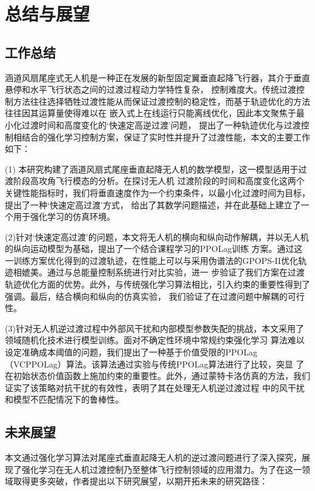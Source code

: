     \chapter{总结与展望}
    \section{工作总结}
    涵道风扇尾座式无人机是一种正在发展的新型固定翼垂直起降飞行器，其介于垂直悬停和水平飞行状态之间的过渡过程动力学特性复杂，
    控制难度大。传统过渡控制方法往往选择牺牲过渡性能从而保证过渡控制的稳定性，而基于轨迹优化的方法往往因其运算量使得难以在
    嵌入式上在线运行只能离线优化，因此本文聚焦于最小化过渡时间和高度变化的‘快速定高逆过渡’问题，
    提出了一种轨迹优化与过渡控制相结合的强化学习控制方案，保证了实时性并提升了过渡性能，本文的主要工作如下：
    
    (1) 本研究构建了涵道风扇式尾座垂直起降无人机的数学模型，这一模型适用于过渡阶段高攻角飞行模态的分析。在探讨无人机
    过渡阶段的时间和高度变化这两个关键性能指标时，我们将垂直速度作为一个约束条件，以最小化过渡时间为目标，提出了一种‘快速定高过渡’方式，
    给出了其数学问题描述，并在此基础上建立了一个用于强化学习的仿真环境。
    
    (2)针对‘快速定高过渡’的问题，本文将无人机的横向和纵向动作解耦，并以无人机的纵向运动模型为基础，提出了一个结合课程学习的PPOLag训练
    方案。通过这一训练方案优化得到的过渡轨迹，在性能上可以与采用伪谱法的GPOPS-II优化轨迹相媲美。通过与总能量控制系统进行对比实验，进一
    步验证了我们方案在过渡轨迹优化方面的优势。此外，与传统强化学习算法相比，引入约束的重要性得到了强调。最后，结合横向和纵向的仿真实验，
    我们验证了在过渡问题中解耦的可行性。
    
    (3)针对无人机逆过渡过程中外部风干扰和内部模型参数失配的挑战，本文采用了领域随机化技术进行模型训练。面对不确定性环境中常规约束强化学习
    算法难以设定准确成本阈值的问题，我们提出了一种基于价值受限的PPOLag（VCPPOLag）算法。该算法通过实验与传统PPOLag算法进行了比较，突显
    了在初始状态价值函数上施加约束的重要性。此外，通过蒙特卡洛仿真的方法，我们证实了该策略对抗干扰的有效性，表明了其在处理无人机逆过渡过程
    中的风干扰和模型不匹配情况下的鲁棒性。
    
    \section{未来展望}
    
    本文通过强化学习算法对尾座式垂直起降无人机的逆过渡问题进行了深入探究，展现了强化学习在无人机过渡控制乃至整体飞行控制领域的应用潜力。为了在这一领域取得更多突破，作者提出以下研究展望，以期开拓未来的研究路径：
    
